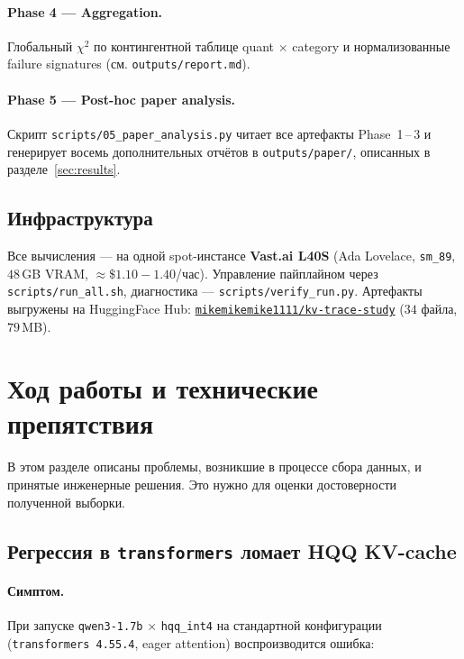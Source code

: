 \documentclass[11pt, a4paper]{article}
\newcommand{\code}[1]{\texttt{#1}}
\newcommand{\chisq}{$\chi^{2}$}
\begin{document}
\paragraph{Phase 4 --- Aggregation.} Глобальный \chisq{} по контингентной
таблице quant $\times$ category и нормализованные failure signatures
(см. \code{outputs/report.md}).

\paragraph{Phase 5 --- Post-hoc paper analysis.} Скрипт
\code{scripts/05\_paper\_analysis.py} читает все артефакты Phase~1\,--\,3
и генерирует восемь дополнительных отчётов в \code{outputs/paper/},
описанных в разделе~\ref{sec:results}.

\subsection{Инфраструктура}

Все вычисления — на одной spot-инстансе \textbf{Vast.ai L40S} (Ada Lovelace,
\code{sm\_89}, $48\,$GB VRAM, $\approx \$1.10{-}1.40$/час). Управление
пайплайном через \code{scripts/run\_all.sh}, диагностика —
\code{scripts/verify\_run.py}. Артефакты выгружены на HuggingFace Hub:
\href{https://huggingface.co/datasets/mikemikemike1111/kv-trace-study}
{\code{mikemikemike1111/kv-trace-study}} ($34$ файла, $79\,$MB).

\section{Ход работы и технические препятствия}

В этом разделе описаны проблемы, возникшие в процессе сбора данных, и
принятые инженерные решения. Это нужно для оценки достоверности
полученной выборки.

\subsection{Регрессия в \code{transformers} ломает HQQ KV-cache}
\label{sec:transformers-bug}

\paragraph{Симптом.} При запуске \code{qwen3-1.7b} $\times$ \code{hqq\_int4}
на стандартной конфигурации (\code{transformers 4.55.4}, eager attention)
воспроизводится ошибка:
\end{document}
